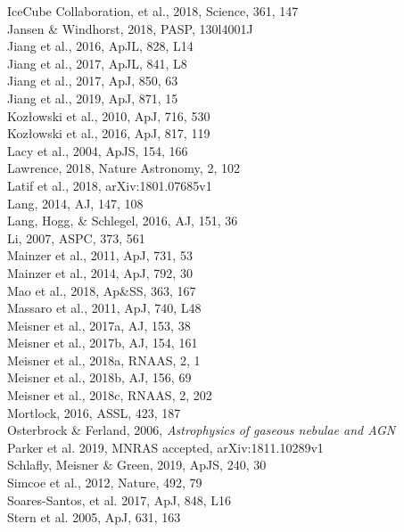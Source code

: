 \documentclass[12pt]{article}
\begin{document}
IceCube Collaboration, et al., 2018, Science, 361, 147 \\
Jansen \& Windhorst, 2018, PASP, 130l4001J \\
Jiang et al., 2016, ApJL, 828, L14 \\
Jiang et al., 2017, ApJL, 841, L8\\ 	
Jiang et al., 2017, ApJ, 850, 63  \\
Jiang et al., 2019, ApJ, 871, 15 \\
Koz{\l}owski et al., 2010, ApJ, 716, 530 \\  
Koz{\l}owski et al., 2016, ApJ, 817, 119 \\
Lacy et al., 2004, ApJS, 154, 166 \\
Lawrence, 2018, Nature Astronomy, 2, 102 \\
Latif et al., 2018, arXiv:1801.07685v1 \\
Lang, 2014, AJ, 147, 108	\\
Lang, Hogg, \& Schlegel, 2016, AJ, 151, 36 \\
Li, 2007, ASPC, 373, 561\\
Mainzer et al., 2011, ApJ, 731, 53 \\
Mainzer et al., 2014, ApJ, 792, 30 \\
Mao et al., 2018,  Ap\&SS, 363, 167\\   %
Massaro et al., 2011, ApJ, 740, L48 \\ %
Meisner et al., 2017a, AJ, 153, 38 \\    
Meisner et al., 2017b, AJ, 154, 161 \\
Meisner et al., 2018a, RNAAS, 2, 1 \\
Meisner et al., 2018b, AJ, 156, 69 \\
Meisner et al., 2018c, RNAAS, 2, 202 \\
Mortlock, 2016, ASSL, 423, 187 \\
Osterbrock \& Ferland, 2006, {\it Astrophysics of gaseous nebulae and AGN}   \\ %
Parker et al. 2019, MNRAS accepted, arXiv:1811.10289v1 \\
Schlafly,  Meisner  \& Green, 2019, ApJS, 240, 30 \\
Simcoe et al., 2012, Nature, 492, 79 \\
Soares-Santos, et al. 2017, ApJ, 848, L16	\\
Stern et al. 2005, ApJ, 631, 163 \\
\end{document}
